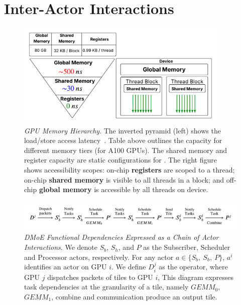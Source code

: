 \section{Inter-Actor Interactions}\label{sec:inter-actor-interactions}
\begin{figure}[!ht]
    \centering
    \includegraphics[width=4in, keepaspectratio]{figures/mem}
    \caption{\emph{GPU Memory Hierarchy}.
    The inverted pyramid (left) shows the load/store access latency~\cite{10579250, amperearch, ptx}. Table above outlines the capacity for different memory tiers (for A100 GPUs). The shared memory and register capacity are static configurations for \sysname.
    The right figure shows accessibility scopes: on-chip \textbf{registers}
    are scoped to a thread; on-chip \textbf{shared memory} is visible to all threads in a block;
    and off-chip \textbf{global memory} is accessible by all threads on device.}
    \label{fig:mem}
\end{figure}
\begin{figure}[!ht]
    \centering
    \vspace{-3mm}
    \includegraphics[width=\linewidth]{figures/actors}
    \caption{\emph{DMoE Functional Dependencies Expressed as a Chain of Actor Interactions}.
    We denote $S_b$, $S_h$, and $P$ as the
    Subscriber, Scheduler and Processor actors, respectively. For any actor $a \in \{S_b,\>S_b,\>P\}$,
        $a^i$ identifies an actor on GPU $i$. We define $D^j_i$ as the operator,
        where GPU $j$ dispatches packets of tiles to GPU $i$,
        This diagram expresses task dependencies at the granularity of a tile, namely
        $GEMM_0$, $GEMM_1$, combine and communication produce an output tile.
    }
    \label{fig:actors}
    \vspace{-4mm}
\end{figure}
